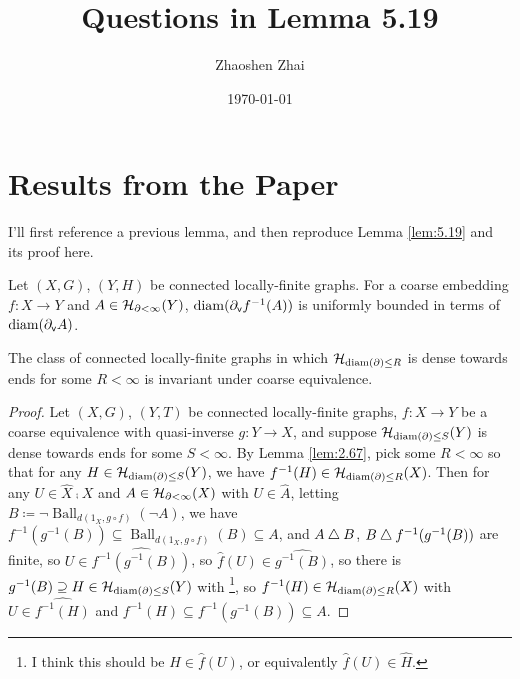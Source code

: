 \documentclass{amsart}
\begin{document}
    \title{Questions in Lemma 5.19}
    \author{Zhaoshen Zhai}
    \date{\today}
    \maketitle

    \newcommand{\Ball}{\operatorname{Ball}}

    \section{Results from the Paper}

    I'll first reference a previous lemma, and then reproduce Lemma \ref{lem:5.19} and its proof here.

    \setcounter{section}{2}
    \setcounter{theorem}{66}
    \begin{lemma}\label{lem:2.67}
        Let $(X,G)$, $(Y,H)$ be connected locally-finite graphs. For a coarse embedding $f:X\to Y$ and $A\in\mathcal{H}_{\partial<\infty}(Y)$, $\operatorname{diam}(\partial_{\textsf{v}}f^{-1}(A))$ is uniformly bounded in terms of $\operatorname{diam}(\partial_{\textsf{v}}A)$.
    \end{lemma}

    \setcounter{section}{5}
    \setcounter{theorem}{18}
    \begin{lemma}\label{lem:5.19}
        The class of connected locally-finite graphs in which $\mathcal{H}_{\operatorname{diam}(\partial)\leq R}$ is dense towards ends for some $R<\infty$ is invariant under coarse equivalence.
    \end{lemma}
    \begin{proof}
        Let $(X,G)$, $(Y,T)$ be connected locally-finite graphs, $f:X\to Y$ be a coarse equivalence with quasi-inverse $g:Y\to X$, and suppose $\mathcal{H}_{\operatorname{diam}(\partial)\leq S}(Y)$ is dense towards ends for some $S<\infty$. By Lemma \ref{lem:2.67}, pick some $R<\infty$ so that for any $H\in\mathcal{H}_{\operatorname{diam}(\partial)\leq S}(Y)$, we have $f^{-1}(H)\in\mathcal{H}_{\operatorname{diam}(\partial)\leq R}(X)$. Then for any $U\in\widehat{X}\comp X$ and $A\in\mathcal{H}_{\partial<\infty}(X)$ with $U\in\widehat{A}$, letting $B\coloneqq\lnot\Ball_{d(1_X,g\circ f)}(\lnot A)$, we have $f^{-1}(g^{-1}(B))\subseteq\Ball_{d(1_X,g\circ f)}(B)\subseteq A$, and $A\bigtriangleup B$, $B\bigtriangleup f^{-1}(g^{-1}(B))$ are finite, so $U\in\widehat{f^{-1}(g^{-1}(B))}$, so $\widehat{f}(U)\in\widehat{g^{-1}(B)}$, so there is $g^{-1}(B)\supseteq H\in\mathcal{H}_{\operatorname{diam}(\partial)\leq S}(Y)$ with {}\footnote{I think this should be $H\in\widehat{f}(U)$, or equivalently $\widehat{f}(U)\in\widehat{H}$.}, so $f^{-1}(H)\in\mathcal{H}_{\operatorname{diam}(\partial)\leq R}(X)$ with $U\in\widehat{f^{-1}(H)}$ and $f^{-1}(H)\subseteq f^{-1}(g^{-1}(B))\subseteq A$.
    \end{proof}
\end{document}
